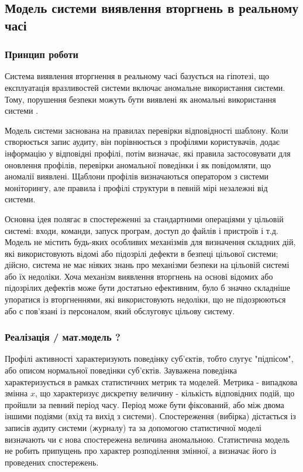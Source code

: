 \newpage
{}
\subsection{Модель системи виявлення вторгнень в реальному часі}
\subsubsection{Принцип роботи}
Система виявлення вторгнення в реальному часі базується на гіпотезі, що 
експлуатація вразливостей системи включає аномальне використання системи.
Тому, порушення безпеки можуть бути виявлені як аномальні використання системи
\cite{denning1987intrusion}.

Модель системи заснована на правилах перевірки відповідності шаблону. Коли
створюється запис аудиту, він порівнюється з профілями користувачів, додає
інформацію у відповідні профілі, потім визначає, які правила застосовувати для
оновлення профілів, перевірки аномальної поведінки і як повідомляти, що аномалії
виявлені. Щаблони профілів визначаються оператором з системи моніторингу, але
правила і профілі структури в певній мірі незалежні від системи.

Основна ідея полягає в спостереженні за стандартними операціями у цільовій
системі: входи, команди, запуск програм, доступ до файлів і пристроїв і т.д. 
Модель не містить будь-яких особливих механізмів для визначення складних дій, 
які використовують відомі або підозрілі дефекти в безпеці цільової системи; 
дійсно, система не має ніяких знань про механізми безпеки на цільовій системі 
або їх недоліки. Хоча механізм виявлення вторгнень на основі відомих або 
підозрілих дефектів може бути достатьно ефективним, було б значно складніше 
упоратися із вторгненнями, які використовують недоліки, що не підозрюються або с 
пов'язані із персоналом, який обслуговує цільову систему.

\subsubsection{Реалізація / мат.модель ?\TBD}

Профілі активності характеризують поведінку суб'єктів, тобто слугує "підпісом", 
або описом нормальної поведінки суб'єктів. Зауважена поведінка характеризується 
в рамках статистичних метрик та моделей. Метрика - випадкова змінна $x$, що 
характеризує дискретну величину - кількість відповідних подій, що пройшли за 
певний період часу. Період може бути фіксований, або між двома іншими подіями
(вхід та вихід з системи). Спостереження (вибірка) дістається із записів аудиту 
системи (журналу) та за допомогою статистичної моделі визначають чи є нова 
спостережена величина аномальною. Статистична модель не робить припущень про
характер розподілення змінної, а визначає його із проведених спостережень.


